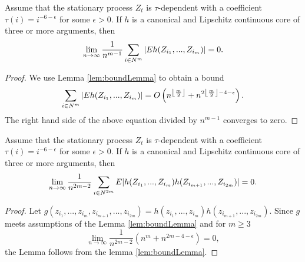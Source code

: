\begin{lemma}
\label{lem:auxAsymp1}
Assume that the stationary process $Z_t$ is $\tau$-dependent with a coefficient $\tau(i) = i^{-6-\epsilon}$ for some $\epsilon>0$. If $h$ is a canonical and Lipschitz continuous core of three or more arguments, then 
\begin{align}
 \lim_{n \to \infty} \frac{1}{n^{m-1}} \sum_{i \in N^{m}} |E   h(Z_{i_1},...,Z_{i_m})| = 0.
\end{align}
\end{lemma}

\begin{proof}
We use Lemma \ref{lem:boundLemma} to obtain a bound 
\begin{align}
\sum_{i \in N^{m}} |E   h(Z_{i_1},...,Z_{i_m})| = O\left(n^{\left\lfloor \frac{m}{2}\right\rfloor }+n^{2\left\lfloor \frac{m}{2}\right\rfloor-4-\epsilon}\right).
\end{align} 
The right hand side of the above equation divided by $n^{m-1}$ converges to zero.      
\end{proof}




\begin{lemma}
\label{lem:auxAsymp2}
Assume that the stationary process $Z_t$ is $\tau$-dependent with a coefficient $\tau(i) = i^{-6-\epsilon}$ for some $\epsilon>0$. If $h$ is a canonical and Lipschitz continuous core of three or more arguments, then
\begin{align}
\lim_{n \to \infty}\frac{1} {n^{2m-2}}   \sum_{i \in N^{2m}} E |h(Z_{i_1},...,Z_{i_m})h(Z_{i_{m+1}},...,Z_{i_{2m}})| = 0.
\end{align}
\end{lemma}
\begin{proof}
Let $g(z_{i_1},...,z_{i_m},z_{i_{m+1}},...,z_{i_{2m}})=h(z_{i_1},...,z_{i_m})h(z_{i_{m+1}},...,z_{i_{2m}})$. Since $g$ meets assumptions of the Lemma \ref{lem:boundLemma} and for $m \geq 3 $ 
\begin{equation}
\lim_{n \to \infty} \frac{1} {n^{2m-2}} \left(n^m + n^{2m -4-\epsilon} \right) =0 ,
\end{equation}
the Lemma follows from the lemma \ref{lem:boundLemma}.
\end{proof}





